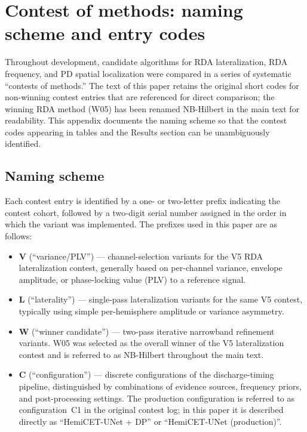 \documentclass{iopjournal}
\begin{document}
\appendix

\section{Contest of methods: naming scheme and entry codes}
\label{app:contest}

Throughout development, candidate algorithms for RDA lateralization, RDA frequency, and PD spatial localization were compared in a series of systematic ``contests of methods.'' The text of this paper retains the original short codes for non-winning contest entries that are referenced for direct comparison; the winning RDA method (W05) has been renamed NB-Hilbert in the main text for readability. This appendix documents the naming scheme so that the contest codes appearing in tables and the Results section can be unambiguously identified.

\subsection{Naming scheme}

Each contest entry is identified by a one- or two-letter prefix indicating the contest cohort, followed by a two-digit serial number assigned in the order in which the variant was implemented. The prefixes used in this paper are as follows:

\begin{itemize}
\item \textbf{V} (``variance/PLV'') --- channel-selection variants for the V5 RDA lateralization contest, generally based on per-channel variance, envelope amplitude, or phase-locking value (PLV) to a reference signal.
\item \textbf{L} (``laterality'') --- single-pass lateralization variants for the same V5 contest, typically using simple per-hemisphere amplitude or variance asymmetry.
\item \textbf{W} (``winner candidate'') --- two-pass iterative narrowband refinement variants. W05 was selected as the overall winner of the V5 lateralization contest and is referred to as NB-Hilbert throughout the main text.
\item \textbf{C} (``configuration'') --- discrete configurations of the discharge-timing pipeline, distinguished by combinations of evidence sources, frequency priors, and post-processing settings. The production configuration is referred to as configuration~C1 in the original contest log; in this paper it is described directly as ``HemiCET-UNet + DP'' or ``HemiCET-UNet (production)''.
\end{itemize}
\end{document}
